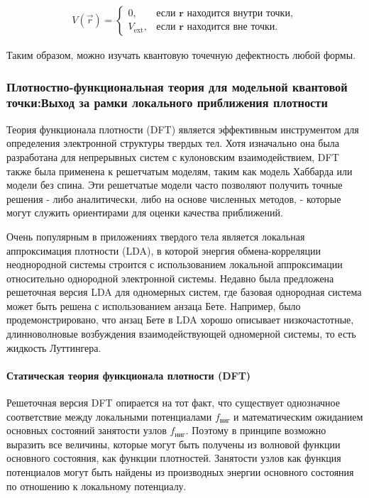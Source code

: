 \documentclass[a4paper,14pt]{extarticle}
\begin{document}
\begin{eqnarray}
    V(\vec{r}) = \begin{cases}
    0, & \text{если } \mathbf{r} \text{ находится внутри точки}, \\
    V_{\text{ext}}, & \text{если } \mathbf{r} \text{ находится вне точки}.
    \end{cases}
    \end{eqnarray}
    
Таким образом, можно изучать квантовую точечную дефектность любой формы.

\subsubsection*{Плотностно-функциональная теория для модельной квантовой точки:Выход за рамки локального приближения плотности}

Теория функционала плотности (DFT) является эффективным инструментом для определения электронной структуры твердых тел. Хотя изначально она была разработана для непрерывных систем с кулоновским взаимодействием, DFT также была применена к решетчатым моделям, таким как модель Хаббарда или модели без спина. Эти решетчатые модели часто позволяют получить точные решения - либо аналитически, либо на основе численных методов, - которые могут служить ориентирами для оценки качества приближений.\cite{schenk}

Очень популярным в приложениях твердого тела является локальная аппроксимация плотности (LDA), в которой энергия обмена-корреляции неоднородной системы строится с использованием локальной аппроксимации относительно однородной электронной системы. Недавно была предложена решеточная версия LDA для одномерных систем, где базовая однородная система может быть решена с использованием анзаца Бете. Например, было продемонстрировано, что анзац Бете в LDA хорошо описывает низкочастотные, длинноволновые возбуждения взаимодействующей одномерной системы, то есть жидкость Луттингера.\cite{schenk}

\paragraph{Статическая теория функционала плотности (DFT)}

Решеточная версия DFT опирается на тот факт, что существует однозначное соответствие между локальными потенциалами $f_{\text{виг}}$ и математическим ожиданием основных состояний занятости узлов $f_{\text{ниг}}$. Поэтому в принципе возможно выразить все величины, которые могут быть получены из волновой функции основного состояния, как функции плотностей. Занятости узлов как функция потенциалов могут быть найдены из производных энергии основного состояния по отношению к локальному потенциалу.\cite{schenk}
\end{document}
